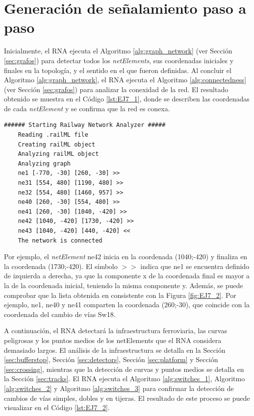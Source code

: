 \section{Generación de señalamiento paso a paso}

	Inicialmente, el RNA ejecuta el Algoritmo \ref{alg:graph_network} (ver Sección \ref{sec:grafos}) para detectar todos los \textit{netElements}, sus coordenadas iniciales y finales en la topología, y el sentido en el que fueron definidas. Al concluir el Algoritmo \ref{alg:graph_network}, el RNA ejecuta el Algoritmo \ref{alg:connectedness} (ver Sección \ref{sec:grafos}) para analizar la conexidad de la red. El resultado obtenido se muestra en el Código \ref{lst:EJ7_1}, donde se describen las coordenadas de cada \textit{netElement} y se confirma que la red es conexa.
	
	\begin{lstlisting}[language = {}, caption = Detección de \textit{netElements} por parte del RNA , label = {lst:EJ7_1}]
	###### Starting Railway Network Analyzer #####
	Reading .railML file
	Creating railML object
	Analyzing railML object
	Analyzing graph
	ne1 [-770, -30] [260, -30] >>
	ne31 [554, 480] [1190, 480] >>
	ne32 [554, 480] [1460, 957] >>
	ne40 [260, -30] [554, 480] >>
	ne41 [260, -30] [1040, -420] >>
	ne42 [1040, -420] [1730, -420] >>
	ne43 [1040, -420] [440, -420] <<
	The network is connected
	\end{lstlisting}
	
	Por ejemplo, el \textit{netElement} ne42 inicia en la coordenada (1040;-420) y finaliza en la coordenada (1730;-420). El símbolo $>>$ indica que ne1 se encuentra definido de izquierda a derecha, ya que la componente x de la coordenada final es mayor a la de la coordenada inicial, teniendo la misma componente y. Además, se puede comprobar que la lista obtenida en consistente con la Figura \ref{fig:EJ7_2}. Por ejemplo, ne1, ne40 y ne41 comparten la coordenada (260;-30), que coincide con la coordenada del cambio de vías Sw18.
	
	A continuación, el RNA detectará la infraestructura ferroviaria, las curvas peligrosas y los puntos medios de los netElements que el RNA considera demasiado largos. El análisis de la infraestructura se detalla en la Sección \ref{sec:bufferstop}, Sección \ref{sec:detectors}, Sección \ref{sec:platform} y Sección \ref{sec:crossing}, mientras que la detección de curvas y puntos medios se detalla en la Sección \ref{sec:tracks}. El RNA ejecuta el Algoritmo \ref{alg:switches_1}, Algoritmo \ref{alg:switches_2} y Algoritmo \ref{alg:switches_3} para confirmar la detección de cambios de vías simples, dobles y en tijeras. El resultado de este proceso se puede visualizar en el Código \ref{lst:EJ7_2}.
	
